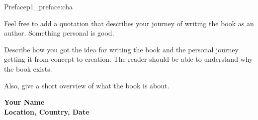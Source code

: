 

\begin{chapterpage}{Preface}{p1_preface:cha}

\begin{myquotation}
Feel free to add a quotation that describes your journey of writing the book as an author. Something personal is good.\end{myquotation}


\end{chapterpage}

Describe how you got the idea for writing the book and the personal journey getting it from concept to creation. The reader should be able to understand why the book exists.

Also, give a short overview of what the book is about.

\noindent \textbf{Your Name \\
Location, Country, Date\\}



\hfil{}\hfil





	
	
    
